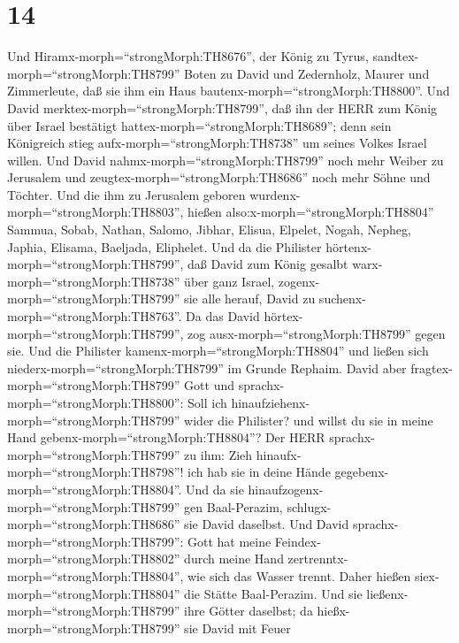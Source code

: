 \hypertarget{section-13}{%
\section{14}\label{section-13}}

 Und Hiramx-morph=``strongMorph:TH8676'', der König zu
Tyrus, sandtex-morph=``strongMorph:TH8799'' Boten zu David und
Zedernholz, Maurer und Zimmerleute, daß sie ihm ein Haus
bautenx-morph=``strongMorph:TH8800''.  Und David
merktex-morph=``strongMorph:TH8799'', daß ihn der HERR zum König über
Israel bestätigt hattex-morph=``strongMorph:TH8689''; denn sein
Königreich stieg aufx-morph=``strongMorph:TH8738'' um seines Volkes
Israel willen.  Und David nahmx-morph=``strongMorph:TH8799''
noch mehr Weiber zu Jerusalem und zeugtex-morph=``strongMorph:TH8686''
noch mehr Söhne und Töchter.  Und die ihm zu Jerusalem
geboren wurdenx-morph=``strongMorph:TH8803'', hießen
also:x-morph=``strongMorph:TH8804'' Sammua, Sobab, Nathan, Salomo,
 Jibhar, Elisua, Elpelet,  Nogah, Nepheg,
Japhia,  Elisama, Baeljada, Eliphelet.  Und da
die Philister hörtenx-morph=``strongMorph:TH8799'', daß David zum König
gesalbt warx-morph=``strongMorph:TH8738'' über ganz Israel,
zogenx-morph=``strongMorph:TH8799'' sie alle herauf, David zu
suchenx-morph=``strongMorph:TH8763''. Da das David
hörtex-morph=``strongMorph:TH8799'', zog
ausx-morph=``strongMorph:TH8799'' gegen sie.  Und die
Philister kamenx-morph=``strongMorph:TH8804'' und ließen sich
niederx-morph=``strongMorph:TH8799'' im Grunde Rephaim. 
David aber fragtex-morph=``strongMorph:TH8799'' Gott und
sprachx-morph=``strongMorph:TH8800'': Soll ich
hinaufziehenx-morph=``strongMorph:TH8799'' wider die Philister? und
willst du sie in meine Hand gebenx-morph=``strongMorph:TH8804''? Der
HERR sprachx-morph=``strongMorph:TH8799'' zu ihm: Zieh
hinaufx-morph=``strongMorph:TH8798''! ich hab sie in deine Hände
gegebenx-morph=``strongMorph:TH8804''.  Und da sie
hinaufzogenx-morph=``strongMorph:TH8799'' gen Baal-Perazim,
schlugx-morph=``strongMorph:TH8686'' sie David daselbst. Und David
sprachx-morph=``strongMorph:TH8799'': Gott hat meine
Feindex-morph=``strongMorph:TH8802'' durch meine Hand
zertrenntx-morph=``strongMorph:TH8804'', wie sich das Wasser trennt.
Daher hießen siex-morph=``strongMorph:TH8804'' die Stätte Baal-Perazim.
 Und sie ließenx-morph=``strongMorph:TH8799'' ihre Götter
daselbst; da hießx-morph=``strongMorph:TH8799'' sie David mit Feuer
